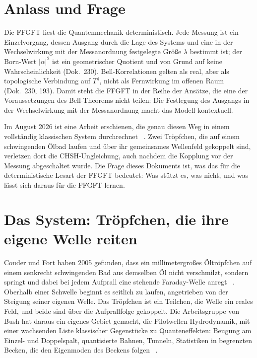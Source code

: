 \section{Anlass und Frage}

Die FFGFT liest die Quantenmechanik deterministisch. Jede Messung ist ein Einzelvorgang, dessen
Ausgang durch die Lage des Systems und eine in der Wechselwirkung mit der Messanordnung festgelegte
Größe $\lambda$ bestimmt ist; der Born-Wert $|\alpha|^2$ ist ein geometrischer Quotient und von Grund
auf keine Wahrscheinlichkeit (Dok.~230). Bell-Korrelationen gelten als real, aber als topologische
Verbindung auf $T^4$, nicht als Fernwirkung im offenen Raum (Dok.~230, 193). Damit steht die FFGFT
in der Reihe der Ansätze, die eine der Voraussetzungen des Bell-Theorems nicht teilen: Die
Festlegung des Ausgangs in der Wechselwirkung mit der Messanordnung macht das Modell kontextuell.

Im August 2026 ist eine Arbeit erschienen, die genau diesen Weg in einem vollständig klassischen
System durchrechnet \QM~\cite{Lopez2026}. Zwei Tröpfchen, die auf einem schwingenden Ölbad laufen und
über ihr gemeinsames Wellenfeld gekoppelt sind, verletzen dort die CHSH-Ungleichung, auch nachdem
die Kopplung vor der Messung abgeschaltet wurde. Die Frage dieses Dokuments ist, was das für die
deterministische Lesart der FFGFT bedeutet: Was stützt es, was nicht, und was lässt sich daraus
für die FFGFT lernen.

\section{Das System: Tröpfchen, die ihre eigene Welle reiten}

Couder und Fort haben 2005 gefunden, dass ein millimetergroßes Öltröpfchen auf einem senkrecht
schwingenden Bad aus demselben Öl nicht verschmilzt, sondern springt und dabei bei jedem Aufprall
eine stehende Faraday-Welle anregt \QM~\cite{Couder2005}. Oberhalb einer Schwelle beginnt es
seitlich zu laufen, angetrieben von der Steigung seiner eigenen Welle. Das Tröpfchen ist ein
Teilchen, die Welle ein reales Feld, und beide sind über die Aufprallfolge gekoppelt. Die
Arbeitsgruppe von Bush hat daraus ein eigenes Gebiet gemacht, die Pilotwellen-Hydrodynamik, mit
einer wachsenden Liste klassischer Gegenstücke zu Quanteneffekten: Beugung am Einzel- und Doppelspalt,
quantisierte Bahnen, Tunneln, Statistiken in begrenzten Becken, die den Eigenmoden des Beckens folgen
\QM~\cite{BushOza2021}.

